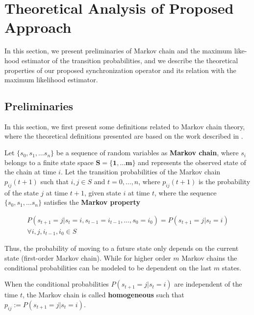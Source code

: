 \section{Theoretical Analysis of Proposed Approach}
 
 In this section, we present preliminaries of Markov chain and the maximum like-hood estimator of the transition probabilities, and we describe the theoretical properties of our proposed synchronization operator and its relation with the maximum likelihood estimator. 
 
 
 \subsection*{Preliminaries}
 In this section, we first present some definitions related to Markov chain theory, 
where the theoretical definitions presented  are based 
on the work described in \cite{bertsekas2002introduction,Billingsley1961,anderson1957statistical,howard2012dynamic}.

\begin{definition}
	Let $\{s_0, s_1, \ldots s_n\}$ be a sequence of random variables as \textbf{Markov chain}, where $s_i$ belongs to a finite state space $\mathbf{S =\{1,\ldots m\}}$ and represents the observed state of the chain at time $i$. Let the transition probabilities of the Markov chain $p_{ij}(t+1)$ such that $i,j \in S$ and $t=0,\ldots, n$, where  $p_{ij}(t+1)$ is the probability of the state $j$ at time $t+1$, given state $i$ at time $t$, where the sequence $\{s_0, s_1, \ldots s_n\}$ satisfies the \textbf{Markov property} 
	
	\begin{equation}
	\begin{aligned}
	P(s_{t+1}=j|s_{t}=i,s_{t-1}=i_{t-1},\ldots ,s_{0}=i_{0})=P(s_{t+1}=j|s_{t}=i)\\
	\forall i,j,i_{t-1},i_{0} \in S
	\end{aligned}
	\end{equation}

	
	Thus, the probability of moving to a future state only depends on the current  state (first-order Markov chain). While for higher order $m$ Markov chains the conditional probabilities can be modeled to be dependent on the last $m$ states. 
	
	When the conditional probabilities $P(s_{t+1}=j|s_{t}=i)$ are independent of the time $t$, the Markov chain is called \textbf{homogeneous} such that $p_{ij}:=P(s_{t+1}=j|s_{t}=i)$.
	

	
\end{definition}

